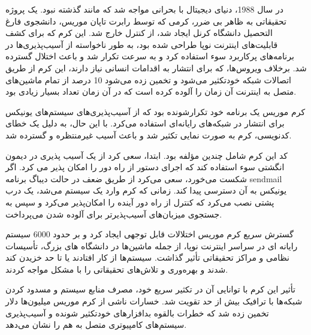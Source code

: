 \documentclass{ISCISC2020}
\begin{document}
در سال 1988، دنیای دیجیتال با بحرانی مواجه شد که مانند گذشته نبود. یک پروژه تحقیقاتی به ظاهر بی ضرر، کرمی که توسط رابرت تاپان موریس، دانشجوی فارغ التحصیل دانشگاه کرنل ایجاد شد، از کنترل خارج شد. این کرم که برای کشف قابلیت‌های اینترنت نوپا طراحی شده بود، به طور ناخواسته از آسیب‌پذیری‌ها در برنامه‌های پرکاربرد سوء استفاده کرد و به سرعت تکرار شد و باعث اختلال گسترده شد. برخلاف ویروس‌ها، که برای انتشار به اقدامات انسانی نیاز دارند، این کرم از طریق اتصالات شبکه خودتکثیر می‌شود و تخمین زده می‌شود 10 درصد از تمام ماشین‌های متصل به اینترنت آن زمان را آلوده کرده است که در آن زمان تعداد بسیار زیادی بود.


کرم موریس یک برنامه خود تکرارشونده بود که از آسیب‌پذیری‌های سیستم‌های یونیکس برای انتشار در شبکه‌های رایانه‌ای استفاده می‌کرد. با این حال، به دلیل یک خطای کدنویسی، کرم به صورت نمایی تکثیر شد و باعث آسیب غیرمنتظره و گسترده شد.

کد این کرم شامل چندین مؤلفه بود. ابتدا، سعی کرد از یک آسیب پذیری در دیمون انگشتی سوء استفاده کند که اجرای دستور از راه دور را امکان پذیر می کرد. اگر شکست می‌خورد، سعی می‌کرد از طریق ضعف در حالت دیباگ برنامه sendmail یونیکس به آن دسترسی پیدا کند. زمانی که کرم وارد یک سیستم می‌شد، یک درب پشتی نصب می‌کرد که کنترل از راه دور آینده را امکان‌پذیر می‌کرد و سپس به جستجوی میزبان‌های آسیب‌پذیرتر برای آلوده شدن می‌پرداخت.

گسترش سریع کرم موریس اختلالات قابل توجهی ایجاد کرد و بر حدود 6000 سیستم رایانه ای در سراسر اینترنت نوپا، از جمله ماشین‌ها در دانشگاه های بزرگ، تأسیسات نظامی و مراکز تحقیقاتی تأثیر گذاشت. سیستم‌ها از کار افتادند یا تا حد خزیدن کند شدند و بهره‌وری و تلاش‌های تحقیقاتی را با مشکل مواجه کردند.

تأثیر این کرم با توانایی آن در تکثیر سریع خود، مصرف منابع سیستم و مسدود کردن شبکه‌ها با ترافیک بیش از حد تقویت شد. خسارات ناشی از کرم موریس میلیون‌ها دلار تخمین زده شد که خطرات بالقوه بدافزارهای خودتکثیر شونده و آسیب‌پذیری سیستم‌های کامپیوتری متصل به هم را نشان می‌دهد.
\end{document}
